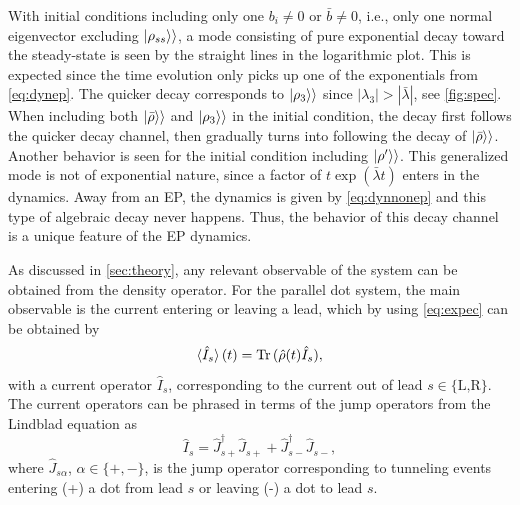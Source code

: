 \documentclass[../main.tex]{subfiles}
\begin{document}
With initial conditions including only one $b_i\neq0$ or $\bar b\neq0$, i.e., only one normal eigenvector excluding $\ket{\rho_{ss}}\rangle$, a mode consisting of pure exponential decay toward the steady-state is seen by the straight lines in the logarithmic plot. This is expected since the time evolution only picks up one of the exponentials from \cref{eq:dynep}. The quicker decay corresponds to $\ket{\rho_3}\rangle$ since $|\lambda_3| > |\bar\lambda|$, see \cref{fig:spec}. When including both $\ket{\bar \rho}\rangle$ and $\ket{\rho_3}\rangle$ in the initial condition, the decay first follows the quicker decay channel, then gradually turns into following the decay of $\ket{\bar\rho}\rangle$. Another behavior is seen for the initial condition including $\ket{\rho'}\rangle$. This generalized mode is not of exponential nature, since a factor of $t\exp(\bar\lambda t)$ enters in the dynamics. Away from an EP, the dynamics is given by \cref{eq:dynnonep} and this type of algebraic decay never happens. Thus, the behavior of this decay channel is a unique feature of the EP dynamics.

As discussed in \cref{sec:theory}, any relevant observable of the system can be obtained from the density operator. For the parallel dot system, the main observable is the current entering or leaving a lead, which by using \cref{eq:expec} can be obtained by
\begin{equation}\label{eq:current}
    \braket{\hat I_s}(t) = \operatorname{Tr}{(\hat \rho(t)\hat I_s)},
\end{equation}
with a current operator $\hat I_s$, corresponding to the current out of lead $s\in\{\text{L,R}\}$. The current operators can be phrased in terms of the jump operators from the Lindblad equation as 
\begin{equation}\label{eq:currjump}
    \hat I_s = \hat J_{s+}^\dag \hat J_{s+} + \hat J_{s-}^\dag \hat J_{s-},
\end{equation}
where $\hat J_{s\alpha}$, $\alpha\in\{+,-\}$, is the jump operator corresponding to tunneling events entering (+) a dot from lead $s$ or leaving (-) a dot to lead $s$.
\end{document}
